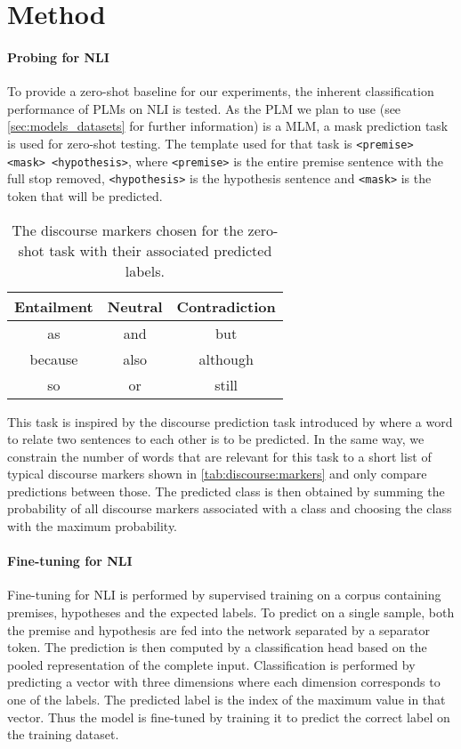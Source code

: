 \documentclass[12pt,a4paper]{article}
\begin{document}
\section{Method} \label{sec:method}
\paragraph{Probing for \acs{NLI}}
To provide a zero-shot baseline for our experiments, the inherent classification performance of \acp{PLM} on \acs{NLI} is tested. As the \ac{PLM} we plan to use (see \autoref{sec:models_datasets} for further information) is a \ac{MLM}, a mask prediction task is used for zero-shot testing. The template used for that task is \texttt{<premise> <mask> <hypothesis>}, where \texttt{<premise>} is the entire premise sentence with the full stop removed, \texttt{<hypothesis>} is the hypothesis sentence and \texttt{<mask>} is the token that will be predicted.

\begin{table}[h]
    \centering
    \caption{The discourse markers chosen for the zero-shot task with their associated predicted labels.}
    \begin{tabular}{c | c | c}
        Entailment & Neutral & Contradiction \\
        \hline
        as & and  & but \\
        because & also & although \\
        so & or & still
    \end{tabular}
    \label{tab:discourse:markers}
\end{table}

This task is inspired by the discourse prediction task introduced by \cite{dissent} where a word to relate two sentences to each other is to be predicted. In the same way, we constrain the number of words that are relevant for this task to a short list of typical discourse markers shown in \autoref{tab:discourse:markers} and only compare predictions between those. The predicted class is then obtained by summing the probability of all discourse markers associated with a class and choosing the class with the maximum probability.

\paragraph{Fine-tuning for \acs{NLI}}

Fine-tuning for \acs{NLI} is performed by supervised training on a corpus containing premises, hypotheses and the expected labels. To predict on a single sample, both the premise and hypothesis are fed into the network separated by a separator token. The prediction is then computed by a classification head based on the pooled representation of the complete input. Classification is performed by predicting a vector with three dimensions where each dimension corresponds to one of the labels. The predicted label is the index of the maximum value in that vector. Thus the model is fine-tuned by training it to predict the correct label on the training dataset.
\end{document}
